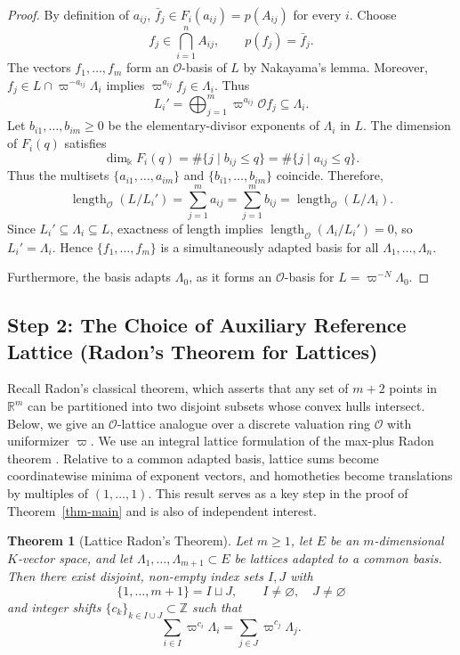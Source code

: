 \documentclass[12pt]{amsart}
\newtheorem{theorem}{Theorem}[section]
\theoremstyle{definition}
\theoremstyle{remark}
\begin{document}
\begin{proof}
By definition of $a_{ij}$,
$\bar f_j\in F_i(a_{ij})=p(A_{ij})$ for every $i$.
Choose
\[
  f_j\in\bigcap\limits_{i=1}^n A_{ij},
  \qquad p(f_j)=\bar f_j.
\]
The vectors $f_1,\ldots,f_m$ form an $\mathcal O$-basis of
$L$ by Nakayama's lemma. Moreover,
$f_j\in L\cap\varpi^{-a_{ij}}\Lambda_i$ implies
$\varpi^{a_{ij}}f_j\in\Lambda_i$. Thus
\[
  L_i'=\bigoplus_{j=1}^m\varpi^{a_{ij}}\mathcal O f_j
  \subseteq\Lambda_i.
\]
Let $b_{i1}, \dots, b_{im} \ge 0$ be the elementary-divisor exponents of $\Lambda_i$ in $L$. The dimension of $F_i(q)$ satisfies
\[
    \dim_\Bbbk F_i(q) = \#\{j \mid b_{ij} \leq q\} = \#\{j \mid a_{ij} \leq q\}.
\]
Thus the multisets $\{a_{i1}, \dots, a_{im}\}$ and $\{b_{i1}, \dots, b_{im}\}$ coincide. Therefore,
\[
    \operatorname{length}_{\mathcal O}(L/L_i') = \sum_{j=1}^m a_{ij} = \sum_{j=1}^m b_{ij} = \operatorname{length}_{\mathcal O}(L/\Lambda_i).
\]
Since $L_i' \subseteq \Lambda_i \subseteq L$, exactness of length implies $\operatorname{length}_{\mathcal O}(\Lambda_i/L_i') = 0$, so $L_i' = \Lambda_i$. Hence $\{f_1, \dots, f_m\}$ is a simultaneously adapted basis for all $\Lambda_1, \dots, \Lambda_n$.

Furthermore, the basis adapts $\Lambda_0$, as it forms an $\mathcal{O}$-basis for $L = \varpi^{-N}\Lambda_0$.
\end{proof}

\subsection{Step 2: The Choice of Auxiliary Reference Lattice (Radon's Theorem for Lattices)}
\label{subsec:Radon_for_lattices}

Recall Radon's classical theorem, which asserts that any set of $m+2$ points in $\mathbb{R}^m$ can be partitioned into two disjoint subsets whose convex hulls intersect. Below, we give an $\mathcal{O}$-lattice analogue over a discrete valuation ring $\mathcal{O}$ with uniformizer $\varpi$. We use an integral lattice formulation of the max-plus Radon theorem \cite[Section~3]{GM}. Relative to a common adapted basis, lattice sums become coordinatewise minima of exponent vectors, and homotheties become translations by multiples of $(1,\ldots,1)$. This result serves as a key step in the proof of Theorem~\ref{thm-main} and is also of independent interest.

\begin{theorem}[Lattice Radon's Theorem]
\label{thm:radon_lattices}
Let $m \ge 1$, let $E$ be an $m$-dimensional $K$-vector space, and let $\Lambda_1, \dots, \Lambda_{m+1} \subset E$ be lattices adapted to a common basis. Then there exist disjoint, non-empty index sets $I,J$ with 
\[
\{1,\ldots,m+1\}=I\sqcup J,
\qquad I\neq\varnothing,\quad J\neq\varnothing
\]
and integer shifts $\{c_k\}_{k \in I \cup J} \subset \mathbb{Z}$ such that
\begin{equation}
\label{eq:radon_lattice_sum}
    \sum_{i \in I} \varpi^{c_i} \Lambda_i = \sum_{j \in J} \varpi^{c_j} \Lambda_j.
\end{equation}
\end{theorem}
\end{document}
